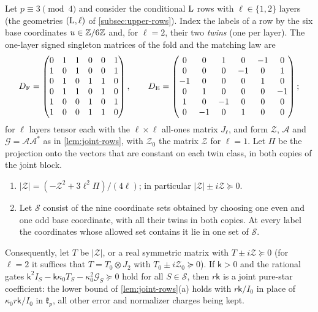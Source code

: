\begin{lemma}\label{lem:joint-pins}
Let $p\equiv3\pmod4$ and consider the conditional $\rm L$ rows with $\ell\in\{1,2\}$
layers (the geometries $({\rm L},\ell)$ of \cref{subsec:upper-rows}). Index the
labels of a row by the six base coordinates $u\in\mathbb Z/6\mathbb Z$ and, for $\ell=2$, their two
\emph{twins} (one per layer). The one-layer signed singleton matrices of the fold and
the matching law are
\[
 D_{\rm F}=\begin{pmatrix}
 0&1&1&0&0&1\\1&0&1&0&0&1\\0&1&0&1&1&0\\
 0&1&1&0&1&0\\1&0&0&1&0&1\\1&0&0&1&1&0\end{pmatrix},\qquad
 D_{\rm E}=\begin{pmatrix}
 0&0&1&0&-1&0\\0&0&0&-1&0&1\\-1&0&0&0&1&0\\
 0&1&0&0&0&-1\\1&0&-1&0&0&0\\0&-1&0&1&0&0\end{pmatrix};
\]
for $\ell$ layers tensor each with the $\ell\times\ell$ all-ones matrix $J_\ell$, and
form $\mathcal Z$, $\mathcal A$ and $\mathcal G=\mathcal A\mathcal A^*$ as in
\cref{lem:joint-rows}, with $\mathcal Z_0$ the matrix $\mathcal Z$ for $\ell=1$. Let $\Pi$
be the projection onto the vectors that are constant on each twin class, in both copies
of the joint block.
\begin{enumerate}[label=\textup{(\alph*)}]
\item $|\mathcal Z|=(-\mathcal Z^2+3\ell^2\Pi)/(4\ell)$; in particular
 $|\mathcal Z|\pm i\mathcal Z\succeq0$.
\item Let $\mathcal S$ consist of the nine coordinate sets obtained by choosing one
 even and one odd base coordinate, with all their twins in both copies. At every label
 the coordinates whose allowed set contains it lie in one set of $\mathcal S$.
\end{enumerate}
Consequently, let $T$ be $|\mathcal Z|$, or a real symmetric matrix with
$T\pm i\mathcal Z\succeq0$ (for $\ell=2$ it suffices that $T=T_0\otimes J_2$ with
$T_0\pm i\mathcal Z_0\succeq0$). If $\mathsf k>0$ and the rational gates
$\mathsf k^2I_S-\mathsf k\kappa_0T_S-\kappa_0^2\mathcal G_S\succeq0$ hold for all
$S\in\mathcal S$, then $r\mathsf k$ is a joint pure-star coefficient: the lower bound of
\cref{lem:joint-rows}(a) holds with $r\mathsf k/I_0$ in place of $\kappa_0r\mathsf k/I_0$
in $\mathfrak k_p$, all other error and normalizer charges being kept.
\end{lemma}


